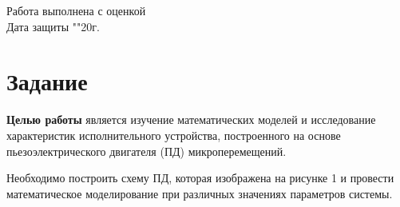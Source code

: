 \documentclass[a4paper, 12pt]{article}
\begin{document}
\begin{titlepage}
	Работа выполнена с оценкой \hspace{1cm} \underline{\hspace{8cm}} \\ 
	\vspace{1cm}
	Дата защиты "\underline{\hspace{0.7cm}}"\hspace{0.2cm}\underline{\hspace{2cm}}\hspace{0.2cm}20\underline{\hspace{0.7cm}}г.
	
\end{titlepage}	


\section{Задание}
\textbf{Целью работы} является изучение математических моделей и исследование характеристик исполнительного устройства, построенного на основе пьезоэлектрического двигателя (ПД) микроперемещений. \par
Необходимо построить схему ПД, которая изображена на рисунке 1 и провести математическое моделирование при различных значениях параметров системы.
\end{document}
